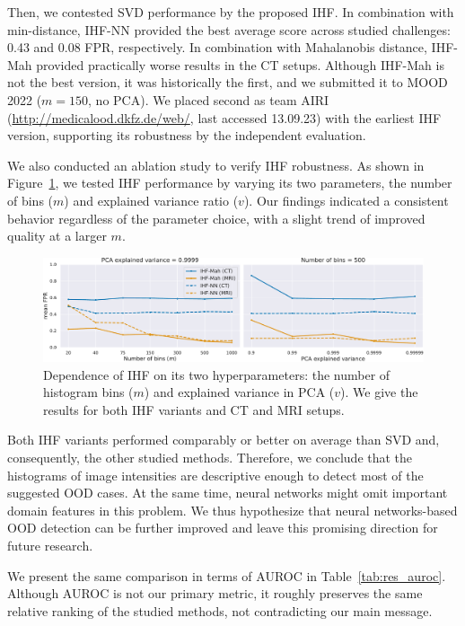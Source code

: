 

Then, we contested SVD performance by the proposed IHF. In combination with min-distance, IHF-NN provided the best average score across studied challenges: 0.43 and 0.08 FPR, respectively. In combination with Mahalanobis distance, IHF-Mah provided practically worse results in the CT setups. Although IHF-Mah is not the best version, it was historically the first, and we submitted it to MOOD 2022 ($m=150$, no PCA). We placed second as team AIRI (\url{http://medicalood.dkfz.de/web/}, last accessed 13.09.23) with the earliest IHF version, supporting its robustness by the independent evaluation.

We also conducted an ablation study to verify IHF robustness. As shown in Figure~\ref{fig:ihf_hyp}, we tested IHF performance by varying its two parameters, the number of bins ($m$) and explained variance ratio ($v$). Our findings indicated a consistent behavior regardless of the parameter choice, with a slight trend of improved quality at a larger $m$.

\begin{figure}[h]
	\centering
	\includegraphics[width=\textwidth]{Dissertation/Figures/5_ood_bench/ihf_hyp.pdf}
	\caption{Dependence of IHF on its two hyperparameters: the number of histogram bins ($m$) and explained variance in PCA ($v$). We give the results for both IHF variants and CT and MRI setups.}
	\label{fig:ihf_hyp}
\end{figure}

Both IHF variants performed comparably or better on average than SVD and, consequently, the other studied methods. Therefore, we conclude that the histograms of image intensities are descriptive enough to detect most of the suggested OOD cases. At the same time, neural networks might omit important domain features in this problem. We thus hypothesize that neural networks-based OOD detection can be further improved and leave this promising direction for future research.

We present the same comparison in terms of AUROC in Table~\ref{tab:res_auroc}. Although AUROC is not our primary metric, it roughly preserves the same relative ranking of the studied methods, not contradicting our main message.

